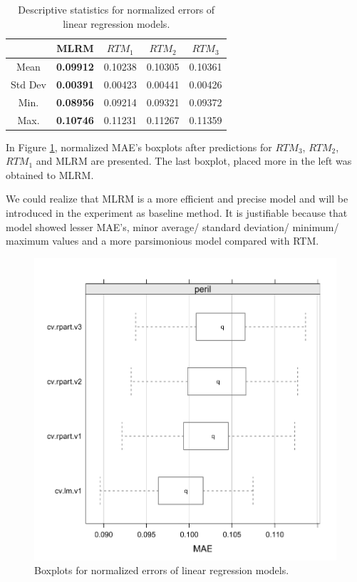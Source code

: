 \documentclass[a4paper,twoside]{article}
\begin{document}
\begin{table}[h]
\caption{Descriptive statistics for normalized errors of linear regression models.}\label{tab:lm_descriptive} \centering
\begin{tabular}{|c|c|c|c|c|}
  \hline
   & MLRM & $RTM_1$ & $RTM_2$ & $RTM_3$ \\
  \hline
  Mean & \textbf{0.09912} & 0.10238 & 0.10305 & 0.10361  \\
  \hline
  Std Dev & \textbf{0.00391} & 0.00423 & 0.00441 & 0.00426  \\
  \hline
  Min. & \textbf{0.08956} & 0.09214 & 0.09321 & 0.09372  \\
  \hline
  Max. & \textbf{0.10746} & 0.11231 & 0.11267 & 0.11359  \\
  \hline
\end{tabular}
\end{table}

In Figure \ref{fig:mlrm_result}, normalized MAE's boxplots after predictions for $RTM_3$, $RTM_2$, $RTM_1$ and MLRM are presented. The last boxplot, placed more in the left was obtained to MLRM. 

We could realize that MLRM is a more efficient and precise model and will be introduced in the experiment as baseline method. It is justifiable because that model showed lesser MAE's, minor average/ standard deviation/ minimum/ maximum values and a more parsimonious model compared with RTM.

\begin{figure}[!h]
  \vspace{-0.2cm}
  \centering
  \includegraphics[width=\columnwidth]{images/mlrm_result_peril.pdf}
  \caption{Boxplots for normalized errors of linear regression models.}
  \label{fig:mlrm_result}
\end{figure}
\end{document}
